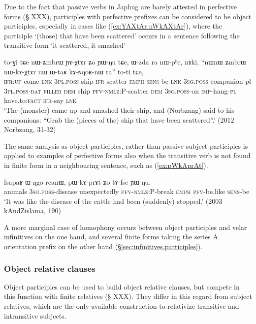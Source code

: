 Due to the fact that passive verbs in Japhug are barely attested in perfective forms (§ XXX), participles with perfective prefixes can be considered to be object participles, especially in cases like (\ref{ex:YAXtAr.nWkAXtAr}), where the participle   `(those) that have been scattered' occurs in a sentence following the transitive form  `it scattered, it smashed'

\begin{exe}
\ex \label{ex:YAXtAr.nWkAXtAr}
 \gll    to-ɣi tɕe nɯ-ʑmbrɯ ɲɤ-χtɤr ʑo ɲɯ-ŋu tɕe, ɯ-zda ra nɯ-pʰe, nɤki,  ``nɯnɯ ʑmbrɯ nɯ-kɤ-χtɤr nɯ ɯ-taʁ kɤ-ɴqoʁ-nɯ ra'' to-ti tɕe,  \\
 \textsc{ifr}:\textsc{up}-come \textsc{lnk} \textsc{3pl}.\textsc{poss}-ship \textsc{ifr}-scatter \textsc{emph} \textsc{sens}-be \textsc{lnk} \textsc{3sg}.\textsc{poss}-companion pl \textsc{3pl}.\textsc{poss}-\textsc{dat} \textsc{filler} \textsc{dem} ship \textsc{pfv}-\textsc{nmlz}:P-scatter \textsc{dem} \textsc{3sg}.\textsc{poss}-on \textsc{imp}-hang-\textsc{pl} have.to:\textsc{fact} \textsc{ifr}-say \textsc{lnk} \\
 \glt `The (monster) came up and smashed their ship, and (Norbzang) said to his companions: ``Grab the (pieces of the) ship that have been scattered''.' (2012 Norbzang, 31-32)
\end{exe}

The same analysis as object participles, rather than passive subject participles is applied to examples of perfective  forms also when the transitive verb is not found in finite form in a neighbouring sentence, such as (\ref{ex:pWkAprAt}).

\begin{exe}
\ex \label{ex:pWkAprAt}
 \gll fsapaʁ ɯ-ŋgo rcanɯ, pɯ-kɤ-prɤt ʑo tɤ-fse ɲɯ-ŋu. \\
 animals \textsc{3sg}.\textsc{poss}-disease unexpectedly \textsc{pfv}-\textsc{nmlz}:P-break \textsc{emph} \textsc{pfv}-be.like \textsc{sens}-be \\
 \glt  `It was like the disease of the cattle had been (suddenly) stopped.' (2003 kAndZislama, 190)
\end{exe}

A more marginal case of homophony occurs between object participles  and velar infinitives on the one hand, and several finite forms taking the series A orientation prefix  on the other hand (§\ref{sec:infinitives.participles}).

\subsubsection{Object relative clauses} \label{sec:object.participle.relatives} 
Object participles can be used to build object relative clauses, but compete in this function with finite relatives (§ XXX). They differ in this regard from subject relatives, which are the only available construction to relativize transitive and intransitive subjects.

